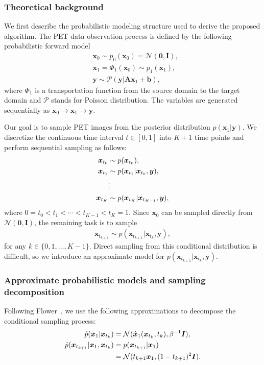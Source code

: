 \documentclass[journal]{IEEEtran}
\begin{document}
\subsubsection{Theoretical background}
We first describe the probabilistic modeling structure used to derive the proposed algorithm. The PET data observation process is defined by the following probabilistic forward model
\begin{align}
&\bm x_0 \sim p_0(\bm x_0) = \mathcal{N}(\bm 0, \bm I), \\
&\bm x_1 = \Phi_1(\bm x_0) \sim p_1(\bm x_1), \\
&\bm y \sim \mathcal{P}(\bm y | \bm A \bm x_1 + \bm b), 
\end{align}
where $\Phi_1$ is a transportation function from the source domain to the target domain and $\mathcal{P}$ stands for Poisson distribution.
The variables are generated sequentially as $\bm x_0 \rightarrow \bm x_1 \rightarrow \bm y$.

Our goal is to sample PET images from the posterior distribution $p(\bm x_1 | \bm y)$. We discretize the continuous time interval $t \in [0, 1]$ into $K+1$ time points and perform sequential sampling as follows:
\begin{align}
\bm x_{t_0} &\sim p(\bm x_{t_0}), \\
\bm x_{t_1} &\sim p(\bm x_{t_1}| \bm x_{t_0}, \bm y), \\
&\vdots \notag \\
\bm x_{t_K} &\sim p(\bm x_{t_K}| \bm x_{t_{K-1}}, \bm y),
\end{align}
where $0=t_0 < t_1 < \cdots < t_{K-1} < t_K=1$.
Since $\bm x_0$ can be sampled directly from $\mathcal{N}(\bm 0, \bm I)$, the remaining task is to sample
\begin{align}
\bm x_{t_{k+1}} \sim p(\bm x_{t_{k+1}} | \bm x_{t_k}, \bm y),
\label{eq:sequential_sampling}
\end{align}
for any $k \in \{0, 1, ..., K-1\}$. 
Direct sampling from this conditional distribution is difficult, so we introduce an approximate model for $p(\bm x_{t_{k+1}} | \bm x_{t_k}, \bm y)$.

\subsubsection{Approximate probabilistic models and sampling decomposition}
Following Flower~\cite{pourya2026flower}, we use the following approximations to decompose the conditional sampling process:
\begin{align}
\tilde{p}(\bm x_1 | \bm x_{t_k}) &= \mathcal{N}(\hat{\bm x}_1(\bm x_{t_k},t_k), \beta^{-1} \bm I), \label{eq:FM_prior}\\
\tilde{p}(\bm x_{t_{k+1}}| \bm x_1, \bm x_{t_k})
&= p(\bm x_{t_{k+1}}| \bm x_1) \notag \\ &= \mathcal{N}( t_{k+1} \bm x_1, (1-t_{k+1})^2 \bm I). \label{eq:stochastic_assumption}
\end{align}
\end{document}
